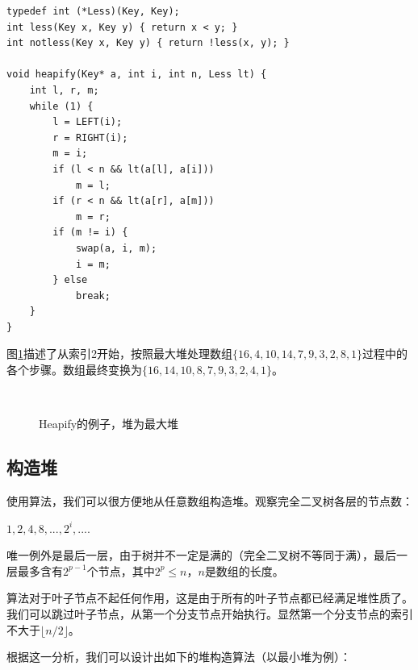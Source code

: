\documentclass[b5paper]{ctexart}
\begin{document}
\begin{lstlisting}
typedef int (*Less)(Key, Key);
int less(Key x, Key y) { return x < y; }
int notless(Key x, Key y) { return !less(x, y); }

void heapify(Key* a, int i, int n, Less lt) {
    int l, r, m;
    while (1) {
        l = LEFT(i);
        r = RIGHT(i);
        m = i;
        if (l < n && lt(a[l], a[i]))
            m = l;
        if (r < n && lt(a[r], a[m]))
            m = r;
        if (m != i) {
            swap(a, i, m);
            i = m;
        } else
            break;
    }
}
\end{lstlisting}

图\ref{fig:heapify}描述了从索引2开始，按照最大堆处理数组$\{16, 4, 10, 14, 7, 9, 3, 2, 8, 1\}$过程中的各个步骤。数组最终变换为$\{16, 14, 10, 8, 7, 9, 3, 2, 4, 1\}$。

\begin{figure}[htbp]
    \centering
     \hspace{0.01\textwidth}
     \\
    \caption{Heapify的例子，堆为最大堆} \label{fig:heapify}
\end{figure}


\subsection{构造堆}

使用算法，我们可以很方便地从任意数组构造堆。观察完全二叉树各层的节点数：

$1, 2, 4, 8, ..., 2^i, ...$.

唯一例外是最后一层，由于树并不一定是满的（完全二叉树不等同于满），最后一层最多含有$2^{p-1}$个节点，其中$2^p \leq n$，$n$是数组的长度。

算法对于叶子节点不起任何作用，这是由于所有的叶子节点都已经满足堆性质了。我们可以跳过叶子节点，从第一个分支节点开始执行。显然第一个分支节点的索引不大于$\lfloor n/2 \rfloor$。

根据这一分析，我们可以设计出如下的堆构造算法（以最小堆为例）：
\end{document}
